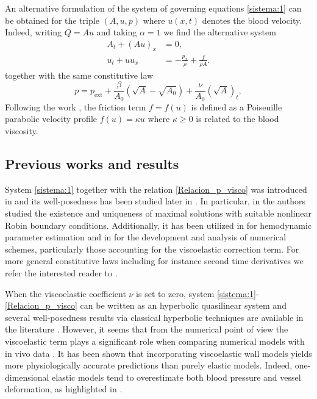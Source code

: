 \documentclass[reqno]{amsart}
\theoremstyle{definition}
\numberwithin{equation}{section}
\numberwithin{theorem}{section}
\numberwithin{definition}{section}
\begin{document}
An alternative formulation of the system of governing equations \eqref{sistema:1} can be obtained for the triple $(A,u,p)$ where $u(x,t)$ denotes the blood velocity. Indeed, writing $Q=Au$ and taking $\alpha=1$ we find the alternative system 
\begin{subequations}\label{sistema:2}
    \begin{align}
        A_t + (Au)_x&= 0,\label{eq1:sistema2}\\
        u_t + uu_x &= -\frac{p_x }{\rho}+ \frac{f}{\rho A}.\label{eq2:sistema2}
    \end{align}
\end{subequations}
together with the same constitutive law
\begin{equation}\label{Relacion_p_visco:2}
    p= p_{\text{ext}} + \frac{\beta}{A_0}\left(\sqrt{A} - \sqrt{A_0}\right) + \frac{\nu}{A_0}(\sqrt{A})_t,
\end{equation}
Following the work \cite{benchmark}, the friction term $f=f(u)$ is defined as a Poiseuille parabolic velocity profile $f(u)=\kappa u$ where $\kappa\geq 0$ is related to the blood viscosity.  



\subsection*{Previous works and results}
System \eqref{sistema:1}  together with the relation \eqref{Relacion_p_visco} was introduced in \cite{Alastruey2011} and its well-posedness has been studied later in \cite{Canic2006, viscoelastico }. In particular, in \cite{viscoelastico} the authors studied the existence and uniqueness of maximal solutions with suitable nonlinear Robin boundary conditions. Additionally, it has been utilized in \cite{Lal2017,Caiazzo2017 } for hemodynamic parameter estimation and in \cite{Montecinos2014,Wang2015,Wang2016} for the development and analysis of numerical schemes, particularly those accounting for the viscoelastic correction term. For more general constitutive laws including for instance second time derivatives we refer the interested reader to \cite{Armentano,Canic2006}. \medskip


When the viscoelastic coefficient \( \nu \) is set to zero, system \eqref{sistema:1}-\eqref{Relacion_p_visco} can be written as an hyperbolic quasilinear system and several well-posedness results via classical hyperbolic techniques are available in the literature \cite{Canic2003, Montecinos2014}. However, it seems that from the numerical point of view \cite{Muller2016} the viscoelastic term plays a significant role when comparing numerical models with in vivo data \cite{Lal2017}. It has been shown that incorporating viscoelastic wall models yields more physiologically accurate predictions than purely elastic models. Indeed, one-dimensional elastic models tend to overestimate both blood pressure and vessel deformation, as highlighted in \cite{benchmark,one_dimen, gravity}. \medskip
\end{document}
